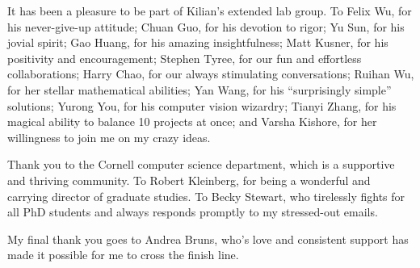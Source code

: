 It has been a pleasure to be part of Kilian's extended lab group.
To Felix Wu, for his never-give-up attitude; Chuan Guo, for his devotion to rigor; Yu Sun, for his jovial spirit; Gao Huang, for his amazing insightfulness;
Matt Kusner, for his positivity and encouragement; Stephen Tyree, for our fun and effortless collaborations;
Harry Chao, for our always stimulating conversations;
Ruihan Wu, for her stellar mathematical abilities;
Yan Wang, for his ``surprisingly simple'' solutions;
Yurong You, for his computer vision wizardry;
Tianyi Zhang, for his magical ability to balance 10 projects at once;
and Varsha Kishore, for her willingness to join me on my crazy ideas.

Thank you to the Cornell computer science department, which is a supportive and thriving community.
To Robert Kleinberg, for being a wonderful and carrying director of graduate studies.
To Becky Stewart, who tirelessly fights for all PhD students and always responds promptly to my stressed-out emails.

My final thank you goes to Andrea Bruns, who's love and consistent support has made it possible for me to cross the finish line.
